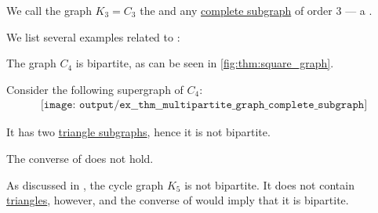 \begin{definition}\label{def:triangle_graph}
  We call the graph \( K_3 = C_3 \) the  and any \hyperref[def:complete_subgraph]{complete subgraph} of order \( 3 \) --- a .
\end{definition}

\begin{example}\label{ex:thm:multipartite_graph_complete_subgraph}
  We list several examples related to :
  \begin{thmenum}
     The graph \( C_4 \) is bipartite, as can be seen in \cref{fig:thm:square_graph}.

    Consider the following supergraph of \( C_4 \):
    \begin{equation}\label{eq:ex:thm:multipartite_graph_complete_subgraph/triangle}
      \begin{aligned}
        \texttt{[image: output/ex\_\_thm\_\_multipartite\_graph\_complete\_subgraph]}
      \end{aligned}
    \end{equation}

    It has two \hyperref[def:triangle_graph]{triangle subgraphs}, hence it is not bipartite.

     The converse of  does not hold.

    As discussed in , the cycle graph \( K_5 \) is not bipartite. It does not contain \hyperref[def:triangle_graph]{triangles}, however, and the converse of  would imply that it is bipartite.
  \end{thmenum}
\end{example}

